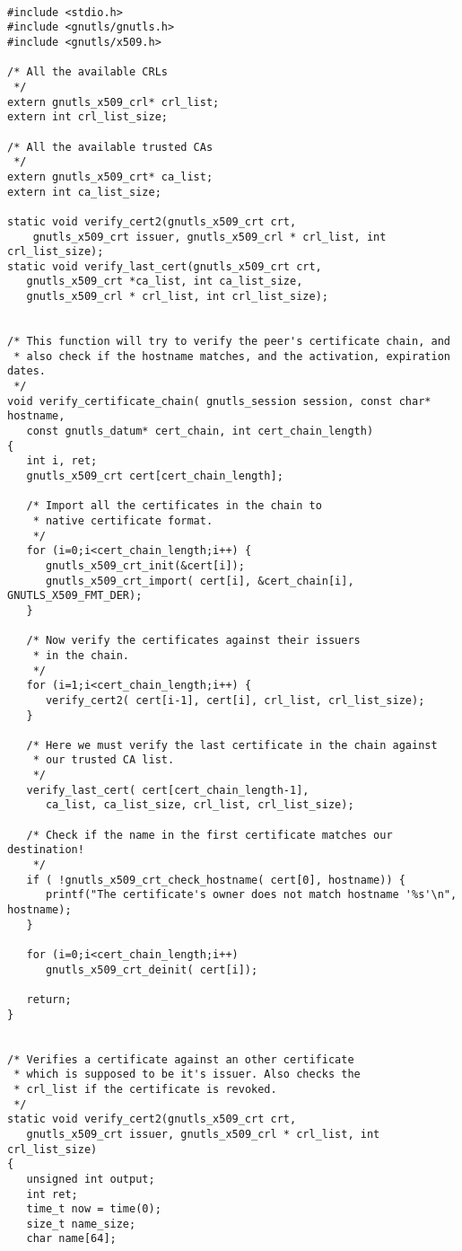 \label{ex:verify-chain}

\begin{verbatim}

#include <stdio.h>
#include <gnutls/gnutls.h>
#include <gnutls/x509.h>

/* All the available CRLs
 */
extern gnutls_x509_crl* crl_list;
extern int crl_list_size;

/* All the available trusted CAs
 */
extern gnutls_x509_crt* ca_list;
extern int ca_list_size;

static void verify_cert2(gnutls_x509_crt crt,
	gnutls_x509_crt issuer, gnutls_x509_crl * crl_list, int crl_list_size);
static void verify_last_cert(gnutls_x509_crt crt,
   gnutls_x509_crt *ca_list, int ca_list_size,
   gnutls_x509_crl * crl_list, int crl_list_size);


/* This function will try to verify the peer's certificate chain, and
 * also check if the hostname matches, and the activation, expiration dates.
 */
void verify_certificate_chain( gnutls_session session, const char* hostname,
   const gnutls_datum* cert_chain, int cert_chain_length)
{
   int i, ret;
   gnutls_x509_crt cert[cert_chain_length];

   /* Import all the certificates in the chain to
    * native certificate format.
    */
   for (i=0;i<cert_chain_length;i++) {
      gnutls_x509_crt_init(&cert[i]);
      gnutls_x509_crt_import( cert[i], &cert_chain[i], GNUTLS_X509_FMT_DER);
   }

   /* Now verify the certificates against their issuers
    * in the chain.
    */   
   for (i=1;i<cert_chain_length;i++) {
      verify_cert2( cert[i-1], cert[i], crl_list, crl_list_size);
   }

   /* Here we must verify the last certificate in the chain against
    * our trusted CA list.
    */
   verify_last_cert( cert[cert_chain_length-1], 
      ca_list, ca_list_size, crl_list, crl_list_size);

   /* Check if the name in the first certificate matches our destination!
    */
   if ( !gnutls_x509_crt_check_hostname( cert[0], hostname)) {
      printf("The certificate's owner does not match hostname '%s'\n", hostname);
   }

   for (i=0;i<cert_chain_length;i++)
      gnutls_x509_crt_deinit( cert[i]);

   return;
}


/* Verifies a certificate against an other certificate
 * which is supposed to be it's issuer. Also checks the
 * crl_list if the certificate is revoked.
 */
static void verify_cert2(gnutls_x509_crt crt,
   gnutls_x509_crt issuer, gnutls_x509_crl * crl_list, int crl_list_size)
{ 
   unsigned int output;
   int ret;
   time_t now = time(0);
   size_t name_size;
   char name[64];


\end{verbatim}
